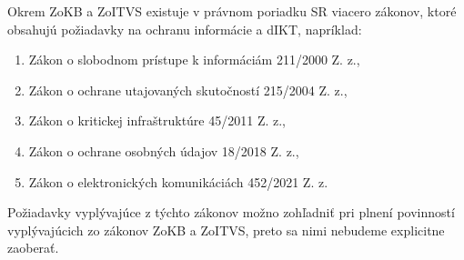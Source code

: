 Okrem \acrshort{ZoKB} a \acrshort{ZoITVS} existuje v právnom poriadku \acrshort{SR} viacero zákonov, ktoré obsahujú požiadavky
na ochranu informácie a \acrshort{dIKT}, napríklad: 
\begin{enumerate}[-]
  \item Zákon o slobodnom prístupe k informáciám 211/2000 Z. z.,
  \item Zákon o ochrane utajovaných skutočností 215/2004 Z. z.,
  \item Zákon o kritickej infraštruktúre 45/2011 Z. z.,
  \item Zákon o ochrane osobných údajov 18/2018 Z. z.,
  \item Zákon o elektronických komunikáciách 452/2021 Z. z.
\end{enumerate}
Požiadavky vyplývajúce z týchto zákonov možno zohľadniť pri plnení povinností vyplývajúcich zo zákonov \acrshort{ZoKB} a
\acrshort{ZoITVS}, preto sa nimi nebudeme explicitne zaoberať.
